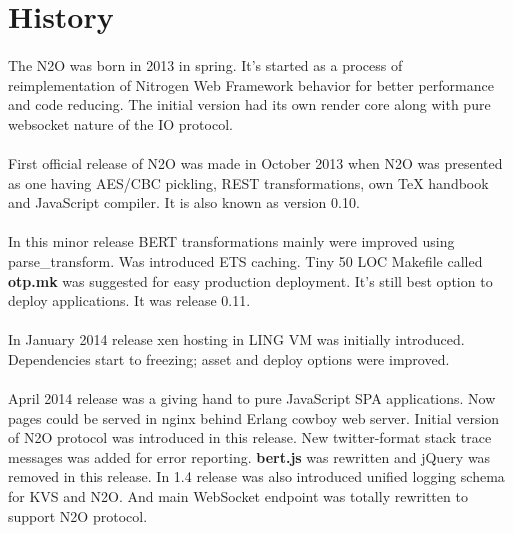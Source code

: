 \begingroup

\section{History}

\paragraph{}
The N2O was born in 2013 in spring. It's started as a process of
reimplementation of Nitrogen Web Framework behavior for better
performance and code reducing. The initial version had its own
render core along with pure websocket nature of the IO protocol.

\paragraph{}
First official release of N2O was made in October 2013 when
N2O was presented as one having AES/CBC pickling,
REST transformations, own TeX handbook and
JavaScript compiler. It is also known as version 0.10.

\paragraph{}
In this minor release BERT transformations mainly were improved using parse\_transform.
Was introduced ETS caching. Tiny 50 LOC Makefile called {\bf otp.mk} was
suggested for easy production deployment. It's still best option to deploy
 applications. It was release 0.11.

\paragraph{}
In January 2014 release xen hosting in LING VM
was initially introduced. Dependencies
start to freezing; asset and deploy options were improved.

\paragraph{}
April 2014 release was a giving hand to pure
JavaScript SPA applications. Now pages could be served
in nginx behind Erlang cowboy web server. Initial version of
N2O protocol was introduced in this release. New twitter-format
stack trace messages was added for error reporting. {\bf bert.js}
was rewritten and jQuery was removed in this release. In 1.4 release
was also introduced unified logging schema for KVS and N2O. And main
WebSocket endpoint was totally rewritten to support N2O protocol.

